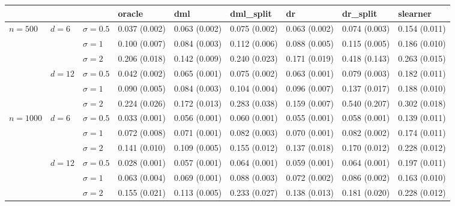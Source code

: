 \documentclass[11pt]{article} %
\theoremstyle{theorem}  %
\theoremstyle{plain}
\begin{document}
\begin{figure}[H]
\scriptsize
\centering
\begin{tabular}{lllllllll}
\toprule
         &        &            &         oracle &            dml &     dml\_split &             dr &      dr\_split &       slearner \\
\midrule
\multirow{6}{*}{$n=500$} & \multirow{3}{*}{$d=6$} & $\sigma=0.5$ &  0.037 (0.002) &  0.063 (0.002) &  0.075 (0.002) &  0.063 (0.002) &  0.074 (0.003) &  0.154 (0.011) \\
         &        & $\sigma=1$ &  0.100 (0.007) &  0.084 (0.003) &  0.112 (0.006) &  0.088 (0.005) &  0.115 (0.005) &  0.186 (0.010) \\
         &        & $\sigma=2$ &  0.206 (0.018) &  0.142 (0.009) &  0.240 (0.023) &  0.171 (0.019) &  0.418 (0.143) &  0.263 (0.015) \\
\cline{2-9}
         & \multirow{3}{*}{$d=12$} & $\sigma=0.5$ &  0.042 (0.002) &  0.065 (0.001) &  0.075 (0.002) &  0.063 (0.001) &  0.079 (0.003) &  0.182 (0.011) \\
         &        & $\sigma=1$ &  0.090 (0.005) &  0.084 (0.003) &  0.104 (0.004) &  0.096 (0.007) &  0.137 (0.017) &  0.188 (0.010) \\
         &        & $\sigma=2$ &  0.224 (0.026) &  0.172 (0.013) &  0.283 (0.038) &  0.159 (0.007) &  0.540 (0.207) &  0.302 (0.018) \\
\cline{1-9}
\cline{2-9}
\multirow{6}{*}{$n=1000$} & \multirow{3}{*}{$d=6$} & $\sigma=0.5$ &  0.033 (0.001) &  0.056 (0.001) &  0.060 (0.001) &  0.055 (0.001) &  0.058 (0.001) &  0.139 (0.011) \\
         &        & $\sigma=1$ &  0.072 (0.008) &  0.071 (0.001) &  0.082 (0.003) &  0.070 (0.001) &  0.082 (0.002) &  0.174 (0.011) \\
         &        & $\sigma=2$ &  0.141 (0.010) &  0.109 (0.005) &  0.155 (0.012) &  0.137 (0.018) &  0.170 (0.012) &  0.228 (0.012) \\
\cline{2-9}
         & \multirow{3}{*}{$d=12$} & $\sigma=0.5$ &  0.028 (0.001) &  0.057 (0.001) &  0.064 (0.001) &  0.059 (0.001) &  0.064 (0.001) &  0.197 (0.011) \\
         &        & $\sigma=1$ &  0.063 (0.004) &  0.069 (0.001) &  0.088 (0.003) &  0.072 (0.002) &  0.086 (0.002) &  0.163 (0.010) \\
         &        & $\sigma=2$ &  0.155 (0.021) &  0.113 (0.005) &  0.233 (0.027) &  0.138 (0.013) &  0.181 (0.020) &  0.228 (0.012) \\

\end{tabular}
\end{figure}
\end{document}
